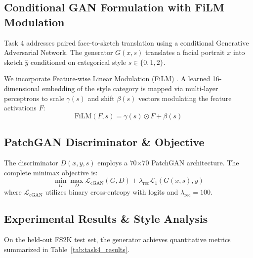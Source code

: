 \documentclass[conference]{IEEEtran}
\begin{document}
\subsection{Conditional GAN Formulation with FiLM Modulation}
Task 4 addresses paired face-to-sketch translation using a conditional Generative Adversarial Network. The generator $G(x, s)$ translates a facial portrait $x$ into sketch $\hat{y}$ conditioned on categorical style $s \in \{0, 1, 2\}$.

We incorporate Feature-wise Linear Modulation (FiLM) \cite{perez2018film}. A learned 16-dimensional embedding of the style category is mapped via multi-layer perceptrons to scale $\gamma(s)$ and shift $\beta(s)$ vectors modulating the feature activations $F$:
\begin{equation}
    \text{FiLM}(F, s) = \gamma(s) \odot F + \beta(s)
\end{equation}

\subsection{PatchGAN Discriminator \& Objective}
The discriminator $D(x, y, s)$ employs a 70$\times$70 PatchGAN architecture. The complete minimax objective is:
\begin{equation}
    \min_G \max_D \mathcal{L}_{\text{cGAN}}(G, D) + \lambda_{\text{rec}} \mathcal{L}_1(G(x, s), y)
\end{equation}
where $\mathcal{L}_{\text{cGAN}}$ utilizes binary cross-entropy with logits and $\lambda_{\text{rec}} = 100$.

\subsection{Experimental Results \& Style Analysis}
On the held-out FS2K test set, the generator achieves quantitative metrics summarized in Table~\ref{tab:task4_results}.

\begin{table}[ht]
\caption{Task 4 Face-to-Sketch Performance on Held-Out FS2K Test Set}
\label{tab:task4_results}
\centering
{}
\end{table}
\end{document}

